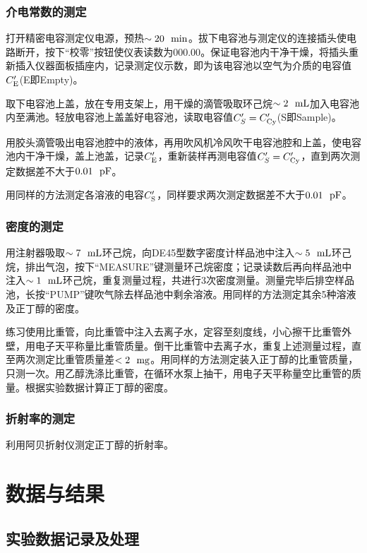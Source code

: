 \documentclass[12pt]{article}
\begin{document}
			\subsubsection{介电常数的测定}
			打开精密电容测定仪电源，预热$\sim 20\ \ {\rm min}$。拔下电容池与测定仪的连接插头使电路断开，按下“校零”按钮使仪表读数为$000.00$。保证电容池内干净干燥，将插头重新插入仪器面板插座内，记录测定仪示数，即为该电容池以空气为介质的电容值$C^{\prime}_{\rm E}$(E即Empty)。\par 
			取下电容池上盖，放在专用支架上，用干燥的滴管吸取环己烷$\sim 2\ \ {\rm mL}$加入电容池内至满池。轻放电容池上盖盖好电容池，读取电容值$C^{\prime}_{S}=C^{\prime}_{\rm Cy}$(S即Sample)。\par 
			用胶头滴管吸出电容池腔中的液体，再用吹风机冷风吹干电容池腔和上盖，使电容池内干净干燥，盖上池盖，记录$C^{\prime}_{\rm E}$，重新装样再测电容值$C^{\prime}_{S}=C^{\prime}_{\rm Cy}$，直到两次测定数据差不大于$\rm 0.01\ \ pF$。\par 
			用同样的方法测定各溶液的电容$C^{\prime}_{\rm S}$，同样要求两次测定数据差不大于$\rm 0.01\ \ pF$。
			
			\subsubsection{密度的测定}
			用注射器吸取$\sim \rm 7\ \ mL$环己烷，向DE45型数字密度计样品池中注入$\sim 5\ \ {\rm mL}$环己烷，排出气泡，按下“MEASURE”键测量环己烷密度；记录读数后再向样品池中注入$\sim 1\ \ {\rm mL}$环己烷，重复测量过程，共进行$3$次密度测量。测量完毕后排空样品池，长按“PUMP”键吹气除去样品池中剩余溶液。用同样的方法测定其余5种溶液及正丁醇的密度。\par 
			练习使用比重管，向比重管中注入去离子水，定容至刻度线，小心擦干比重管外壁，用电子天平称量比重管质量。倒干比重管中去离子水，重复上述测量过程，直至两次测定比重管质量差$<2\ \ {\rm mg}$。用同样的方法测定装入正丁醇的比重管质量，只测一次。用乙醇洗涤比重管，在循环水泵上抽干，用电子天平称量空比重管的质量。根据实验数据计算正丁醇的密度。
			\subsubsection{折射率的测定}
			利用阿贝折射仪测定正丁醇的折射率。


 \section{数据与结果}
 \subsection{实验数据记录及处理}
\end{document}
